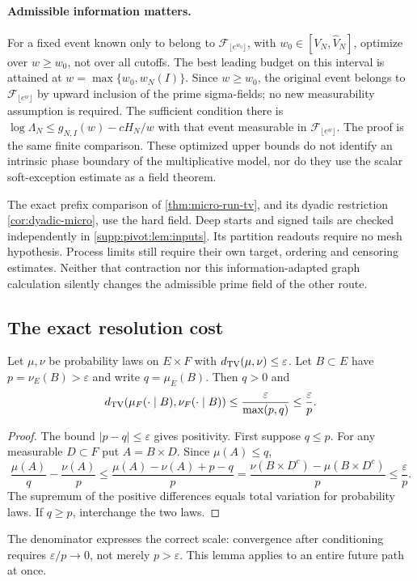 \paragraph{Admissible information matters.}
For a fixed event known only to belong to
$\mathcal F_{\lfloor e^{w_0}\rfloor}$, with
$w_0\in[V_N,\widehat V_N]$, optimize over $w\ge w_0$, not over all
cutoffs. The best leading budget on this interval is attained at
$w=\max\{w_0,w_N(I)\}$. Since $w\ge w_0$, the original event
belongs to $\mathcal F_{\lfloor e^w\rfloor}$ by upward inclusion of the
prime sigma-fields; no new measurability assumption is required.
The sufficient condition there is
$\log\Lambda_N\le g_{N,I}(w)-cH_N/w$ with that event measurable in
$\mathcal F_{\lfloor e^w\rfloor}$. The proof is the same finite
comparison. These optimized upper bounds do not identify an intrinsic
phase boundary of the multiplicative model, nor do they use the scalar
soft-exception estimate as a field theorem.

The exact prefix comparison of \cref{thm:micro-run-tv}, and its dyadic
restriction \cref{cor:dyadic-micro}, use the hard field. Deep starts and
signed tails are checked independently in
\cref{supp:pivot:lem:inputs}. Its partition readouts require no mesh
hypothesis. Process limits still require their own target, ordering and
censoring estimates. Neither that contraction
nor this information-adapted graph calculation silently changes the
admissible prime field of the other route.

\subsection{The exact resolution cost}
\begin{lemma}\label{lem:conditioning-floor}
Let $\mu,\nu$ be probability laws on $E\times F$ with
$d_{\mathrm{TV}}(\mu,\nu)\le\varepsilon$. Let $B\subset E$ have
$p=\nu_E(B)>\varepsilon$ and write $q=\mu_E(B)$. Then $q>0$ and
\begin{equation}\label{eq:sharp-conditioning}
 d_{\mathrm{TV}}(\mu_F(\cdot\mid B),\nu_F(\cdot\mid B))
 \le\frac{\varepsilon}{\max(p,q)}\le\frac{\varepsilon}{p}.
\end{equation}
\end{lemma}
\begin{proof}
The bound $|p-q|\le\varepsilon$ gives positivity. First suppose $q\le p$.
For any measurable $D\subset F$ put $A=B\times D$. Since $\mu(A)\le q$,
\[
 \frac{\mu(A)}q-\frac{\nu(A)}p
 \le\frac{\mu(A)-\nu(A)+p-q}{p}
 =\frac{\nu(B\times D^c)-\mu(B\times D^c)}p
 \le\frac\varepsilon p.
\]
The supremum of the positive differences equals total variation for
probability laws. If $q\ge p$, interchange the two laws.
\end{proof}
The denominator expresses the correct scale: convergence after conditioning
requires $\varepsilon/p\to0$, not merely $p>\varepsilon$.
This lemma applies to an entire future path at once.

